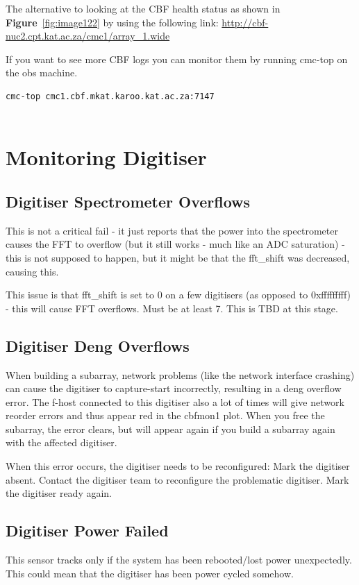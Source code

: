 The alternative to looking at the CBF health status as shown in \textbf{Figure}~\ref{fig:image122} by using the following link:
\url{http://cbf-nuc2.cpt.kat.ac.za/cmc1/array\_1.wide}

If you want to see more CBF logs  you can monitor them by running cmc-top on the obs machine.
\begin{lstlisting}[style=DOS]
cmc-top cmc1.cbf.mkat.karoo.kat.ac.za:7147


\end{lstlisting}

\section{ Monitoring Digitiser }
\subsection{ Digitiser Spectrometer Overflows}

This is not a critical fail - it just reports that the power into the spectrometer causes the FFT to overflow (but it still works - much like an ADC saturation) - this is not supposed to happen, but it might be that the fft\_shift was decreased, causing this. 

This issue is that fft\_shift is set to 0 on a few digitisers (as opposed to 0xfffffffff) - this will cause FFT overflows. Must be at least 7. This is TBD at this stage.

\subsection{ Digitiser Deng Overflows}
When building a subarray, network problems (like the network interface crashing) can cause the digitiser to capture-start incorrectly, resulting in a deng overflow error. The f-host connected to this digitiser also a lot of times will give network reorder errors and thus appear red in the cbfmon1 plot. When you free the subarray, the error clears, but will appear again if you build a subarray again with the affected digitiser.

When this error occurs, the digitiser needs to be reconfigured:
Mark the digitiser absent.
Contact the digitiser team to reconfigure the problematic digitiser.
Mark the digitiser ready again.

\subsection{ Digitiser Power Failed}
This sensor tracks only if the system has been rebooted/lost power unexpectedly. This could mean that the digitiser has been power cycled somehow.

